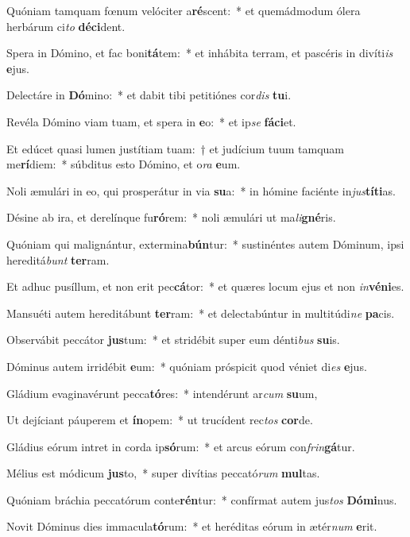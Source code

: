 \item Quóniam tamquam fœnum velóciter a\textbf{ré}scent:~* et quemádmodum ólera herbárum ci\textit{to} \textbf{dé}\textbf{ci}dent.
\item Spera in Dómino, et fac boni\textbf{tá}tem:~* et inhábita terram, et pascéris in divíti\textit{is} \textbf{e}jus.
\item Delectáre in \textbf{Dó}mino:~* et dabit tibi petitiónes cor\textit{dis} \textbf{tu}i.
\item Revéla Dómino viam tuam, et spera in \textbf{e}o:~* et ip\textit{se} \textbf{fá}\textbf{ci}et.
\item Et edúcet quasi lumen justítiam tuam:~† et judícium tuum tamquam me\textbf{rí}diem:~* súbditus esto Dómino, et o\textit{ra} \textbf{e}um.
\item Noli æmulári in eo, qui prosperátur in via \textbf{su}a:~* in hómine faciénte in\textit{jus}\textbf{tí}\textbf{ti}as.
\item Désine ab ira, et derelínque fu\textbf{ró}rem:~* noli æmulári ut ma\textit{li}\textbf{gné}ris.
\item Quóniam qui malignántur, extermina\textbf{bún}tur:~* sustinéntes autem Dóminum, ipsi hereditá\textit{bunt} \textbf{ter}ram.
\item Et adhuc pusíllum, et non erit pec\textbf{cá}tor:~* et quæres locum ejus et non \textit{in}\textbf{vé}\textbf{ni}es.
\item Mansuéti autem hereditábunt \textbf{ter}ram:~* et delectabúntur in multitúdi\textit{ne} \textbf{pa}cis.
\item Observábit peccátor \textbf{jus}tum:~* et stridébit super eum dénti\textit{bus} \textbf{su}is.
\item Dóminus autem irridébit \textbf{e}um:~* quóniam próspicit quod véniet di\textit{es} \textbf{e}jus.
\item Gládium evaginavérunt pecca\textbf{tó}res:~* intendérunt ar\textit{cum} \textbf{su}um,
\item Ut dejíciant páuperem et \textbf{ín}opem:~* ut trucídent rec\textit{tos} \textbf{cor}de.
\item Gládius eórum intret in corda ip\textbf{só}rum:~* et arcus eórum con\textit{frin}\textbf{gá}tur.
\item Mélius est módicum \textbf{jus}to,~* super divítias peccató\textit{rum} \textbf{mul}tas.
\item Quóniam bráchia peccatórum conte\textbf{rén}tur:~* confírmat autem jus\textit{tos} \textbf{Dó}\textbf{mi}nus.
\item Novit Dóminus dies immacula\textbf{tó}rum:~* et heréditas eórum in ætér\textit{num} \textbf{e}rit.
